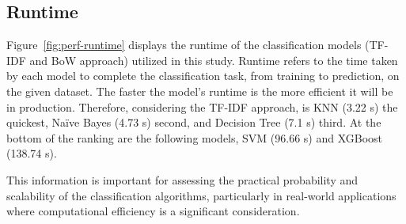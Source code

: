 \break

\subsection{Runtime}


Figure~\ref{fig:perf-runtime} displays the runtime of the classification models (TF-IDF and BoW approach) utilized in this study. Runtime refers to the time taken by each model to complete the classification task, from training to prediction, on the given dataset. The faster the model’s runtime is the more efficient it will be in production. Therefore, considering the TF-IDF approach, is KNN (3.22 s) the quickest, Naïve Bayes (4.73 s) second, and Decision Tree (7.1 s) third. At the bottom of the ranking are the following models, SVM (96.66 s) and XGBoost (138.74 s).

This information is important for assessing the practical probability and scalability of the classification algorithms, particularly in real-world applications where computational efficiency is a significant consideration.
